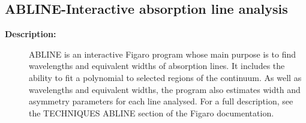 \subsection{ABLINE-\label{ABLINE}Interactive absorption line analysis}
\begin{description}

\item [\textbf{Description:}]
 ABLINE is an interactive Figaro program whose main purpose is to
 find wavelengths and equivalent widths of absorption lines.  It
 includes the ability to fit a polynomial to selected regions of
 the continuum.  As well as wavelengths and equivalent widths, the
 program also estimates width and asymmetry parameters for each
 line analysed.  For a full description, see the TECHNIQUES ABLINE
 section of the Figaro documentation.


\end{description}

